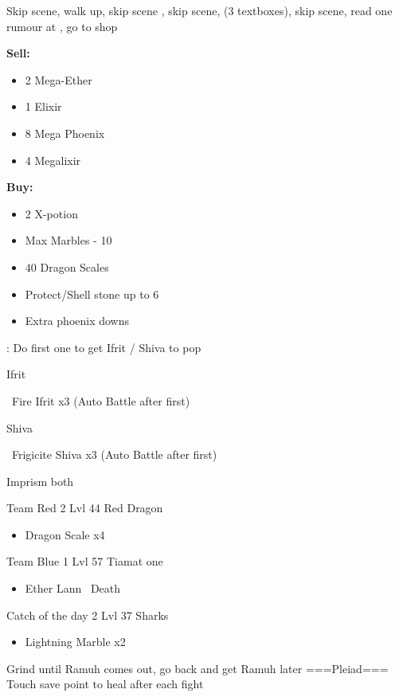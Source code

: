 Skip scene, walk up, skip scene
, skip scene, 
(3 textboxes), skip scene, 
read one rumour at , go to shop
\begin{shop}
\textbf{Sell:}
    \begin{itemize}
        \item 2 Mega-Ether
        \item 1 Elixir
        \item 8 Mega Phoenix
        \item 4 Megalixir
    \end{itemize}
\textbf{Buy:}
    \begin{itemize}
        \item 2 X-potion
        \item Max Marbles - 10
        \item 40 Dragon Scales
        \item Protect/Shell stone up to 6
        \item Extra phoenix downs
    \end{itemize}
\end{shop}
 
:
Do first one to get Ifrit / Shiva to pop
\begin{battle}[]{Ifrit}
    \begin{itemize}
        \reynnf\ Fire Ifrit x3 (Auto Battle after first)
    \end{itemize}
\end{battle}
\begin{battle}[]{Shiva}
    \begin{itemize}
        \lannf\ Frigicite Shiva x3 (Auto Battle after first)
    \end{itemize}
\end{battle}
Imprism both
\begin{battle}[]{Team Red 2 Lvl 44 Red Dragon}
    \begin{itemize}
        \item Dragon Scale x4
    \end{itemize}
\end{battle}
\begin{battle}[]{Team Blue 1 Lvl 57 Tiamat one}
    \begin{itemize}
        \reynnf\ Defend
        \lannf\ Death
        \item Ether Lann
        \lannf\ Death
    \end{itemize}
\end{battle}
\begin{battle}[]{Catch of the day 2 Lvl 37 Sharks}
    \begin{itemize}
        \item Lightning Marble x2
    \end{itemize}
\end{battle}
Grind until Ramuh comes out, go back and get Ramuh later
===Pleiad===
Touch save point to heal after each fight
    
